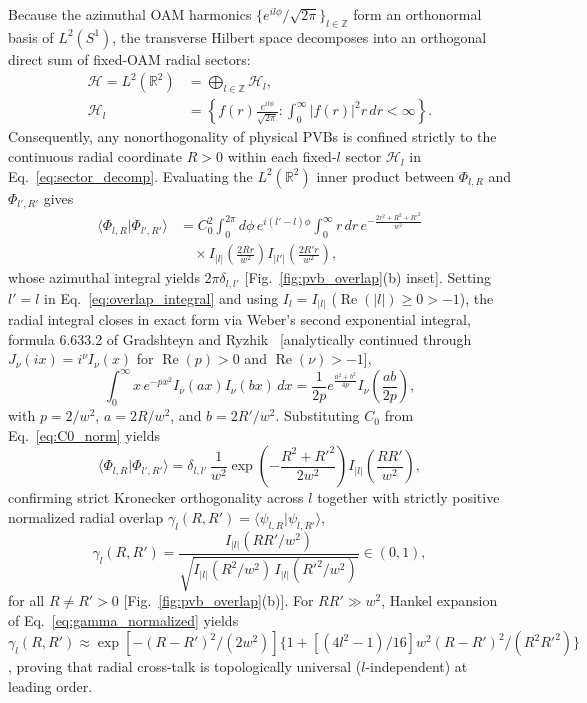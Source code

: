 \documentclass[aps,pra,reprint,nofootinbib,floatfix,longbibliography]{revtex4-2}
\theoremstyle{remark}
\newcommand{\braket}[2]{\langle #1 | #2 \rangle}
\newcommand{\abs}[1]{\lvert #1 \rvert}
\begin{document}
Because the azimuthal OAM harmonics $\{e^{il\phi}/\sqrt{2\pi}\}_{l\in\mathbb{Z}}$ form an orthonormal basis of $L^2(S^1)$, the transverse Hilbert space decomposes into an orthogonal direct sum of fixed-OAM radial sectors:
\begin{align}
\mathcal{H} = L^2(\mathbb{R}^2) &= \bigoplus_{l\in\mathbb{Z}} \mathcal{H}_l, \nonumber \\
\mathcal{H}_l &= \left\{ f(r)\frac{e^{il\phi}}{\sqrt{2\pi}} : \int_0^\infty \abs{f(r)}^2 r\,dr < \infty \right\}.
\label{eq:sector_decomp}
\end{align}
Consequently, any nonorthogonality of physical PVBs is confined strictly to the continuous radial coordinate $R > 0$ within each fixed-$l$ sector $\mathcal{H}_l$ in Eq.~\eqref{eq:sector_decomp}. Evaluating the $L^2(\mathbb{R}^2)$ inner product between $\Phi_{l,R}$ and $\Phi_{l',R'}$ gives
\begin{align}
\braket{\Phi_{l,R}}{\Phi_{l',R'}} &= C_0^2 \int_0^{2\pi} d\phi\, e^{i(l'-l)\phi} \int_0^\infty r\,dr\, e^{-\frac{2r^2 + R^2 + R'^2}{w^2}} \nonumber \\
&\quad \times I_{\abs{l}}\!\left(\frac{2Rr}{w^2}\right) I_{\abs{l'}}\!\left(\frac{2R'r}{w^2}\right),
\label{eq:overlap_integral}
\end{align}
whose azimuthal integral yields $2\pi\delta_{l,l'}$ [Fig.~\ref{fig:pvb_overlap}(b) inset]. Setting $l' = l$ in Eq.~\eqref{eq:overlap_integral} and using $I_l = I_{\abs{l}}$ ($\operatorname{Re}(\abs{l}) \ge 0 > -1$), the radial integral closes in exact form via Weber's second exponential integral, formula 6.633.2 of Gradshteyn and Ryzhik~\cite{Gradshteyn2014} [analytically continued through $J_\nu(ix) = i^\nu I_\nu(x)$ for $\operatorname{Re}(p) > 0$ and $\operatorname{Re}(\nu) > -1$],
\begin{equation}
\int_0^\infty x\, e^{-p x^2} I_\nu(a x) I_\nu(b x)\,dx = \frac{1}{2p} e^{\frac{a^2 + b^2}{4p}} I_\nu\!\left(\frac{ab}{2p}\right),
\label{eq:weber_identity}
\end{equation}
with $p = 2/w^2$, $a = 2R/w^2$, and $b = 2R'/w^2$. Substituting $C_0$ from Eq.~\eqref{eq:C0_norm} yields
\begin{equation}
\braket{\Phi_{l,R}}{\Phi_{l',R'}} = \delta_{l,l'}\,\frac{1}{w^2}\exp\!\left(-\frac{R^2 + R'^2}{2w^2}\right) I_{\abs{l}}\!\left(\frac{RR'}{w^2}\right),
\label{eq:overlap_closed}
\end{equation}
confirming strict Kronecker orthogonality across $l$ together with strictly positive normalized radial overlap $\gamma_l(R,R') = \braket{\psi_{l,R}}{\psi_{l,R'}}$,
\begin{equation}
\gamma_l(R,R') = \frac{I_{\abs{l}}(RR'/w^2)}{\sqrt{I_{\abs{l}}(R^2/w^2)\,I_{\abs{l}}(R'^2/w^2)}} \in (0,1),
\label{eq:gamma_normalized}
\end{equation}
for all $R \neq R' > 0$ [Fig.~\ref{fig:pvb_overlap}(b)]. For $RR' \gg w^2$, Hankel expansion of Eq.~\eqref{eq:gamma_normalized} yields $\gamma_l(R,R') \approx \exp[-(R-R')^2/(2w^2)]\{1 + [(4l^2 - 1)/16]w^2(R-R')^2/(R^2 R'^2)\}$, proving that radial cross-talk is topologically universal ($l$-independent) at leading order.
\end{document}

